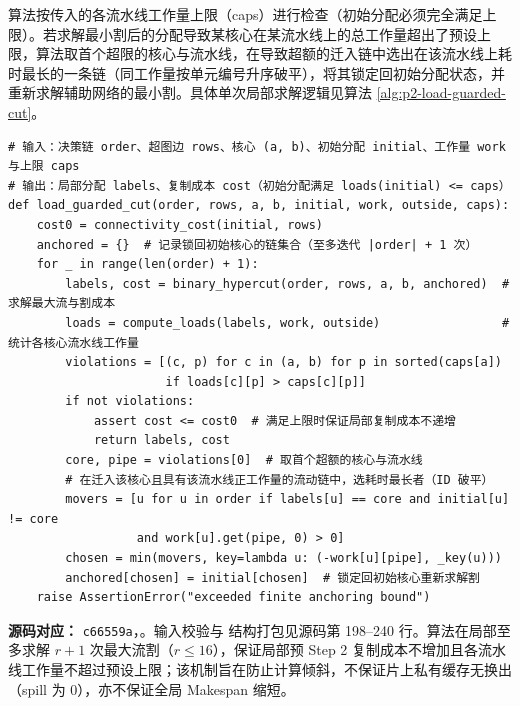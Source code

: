 \documentclass[anonymous,withtoc]{gmcm2026}
\renewcommand{\thealgorithm}{\thesection-\arabic{algorithm}}
\begin{document}
算法按传入的各流水线工作量上限（caps）进行检查（初始分配必须完全满足上限）。若求解最小割后的分配导致某核心在某流水线上的总工作量超出了预设上限，算法取首个超限的核心与流水线，在导致超额的迁入链中选出在该流水线上耗时最长的一条链（同工作量按单元编号升序破平），将其锁定回初始分配状态，并重新求解辅助网络的最小割。具体单次局部求解逻辑见算法 \ref{alg:p2-load-guarded-cut}。

\FloatBarrier
\FloatBarrier\par{}\begingroup\normalsize
\captionsetup{type=algorithm,position=top,justification=raggedright,singlelinecheck=false,labelfont=bf}
\label{alg:p2-load-guarded-cut}
\begin{tcolorbox}[enhanced,breakable,colback=white,colframe=black,
  boxrule=0pt,toprule=.4pt,bottomrule=.4pt,sharp corners,boxsep=0pt,
  left=0pt,right=0pt,top=4pt,bottom=4pt,before skip=2pt,after skip=2pt,
  title after break={算法~\thealgorithm（续）},
  colbacktitle=white,coltitle=black,fonttitle=\normalsize\bfseries]



\begin{lstlisting}[style=paperpseudo]
# 输入：决策链 order、超图边 rows、核心 (a, b)、初始分配 initial、工作量 work 与上限 caps
# 输出：局部分配 labels、复制成本 cost（初始分配满足 loads(initial) <= caps）
def load_guarded_cut(order, rows, a, b, initial, work, outside, caps):
    cost0 = connectivity_cost(initial, rows)
    anchored = {}  # 记录锁回初始核心的链集合（至多迭代 |order| + 1 次）
    for _ in range(len(order) + 1):
        labels, cost = binary_hypercut(order, rows, a, b, anchored)  # 求解最大流与割成本
        loads = compute_loads(labels, work, outside)                 # 统计各核心流水线工作量
        violations = [(c, p) for c in (a, b) for p in sorted(caps[a])
                      if loads[c][p] > caps[c][p]]
        if not violations:
            assert cost <= cost0  # 满足上限时保证局部复制成本不递增
            return labels, cost
        core, pipe = violations[0]  # 取首个超额的核心与流水线
        # 在迁入该核心且具有该流水线正工作量的流动链中，选耗时最长者（ID 破平）
        movers = [u for u in order if labels[u] == core and initial[u] != core
                  and work[u].get(pipe, 0) > 0]
        chosen = min(movers, key=lambda u: (-work[u][pipe], _key(u)))
        anchored[chosen] = initial[chosen]  # 锁定回初始核心重新求解割
    raise AssertionError("exceeded finite anchoring bound")
\end{lstlisting}
\textbf{源码对应：} \texttt{c66559a}，\texttt{}。输入校验与 \texttt{} 结构打包见源码第 198--240 行。算法在局部至多求解 \(r+1\) 次最大流割（\(r \le 16\)），保证局部预 Step 2 复制成本不增加且各流水线工作量不超过预设上限；该机制旨在防止计算倾斜，不保证片上私有缓存无换出（spill 为 0），亦不保证全局 Makespan 缩短。

\end{tcolorbox}\endgroup
\end{document}
